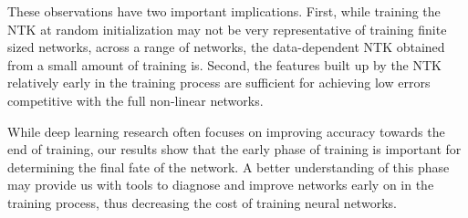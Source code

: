 \documentclass{article}
\begin{document}
These observations have two important implications. 
First, while training the NTK at random initialization may not be very representative of training finite sized networks, across a range of networks, the data-dependent NTK obtained from a small amount of training is. 
Second, the features built up by the NTK relatively early in the training process are sufficient for achieving low errors competitive with the full non-linear networks.

While deep learning research often focuses on improving accuracy towards the end of training, our results show that the early phase of training is important for determining the final fate of the network. 
A better understanding of this phase may provide us with tools to diagnose and improve networks early on in the training process, thus decreasing the cost of training neural networks.
\end{document}
